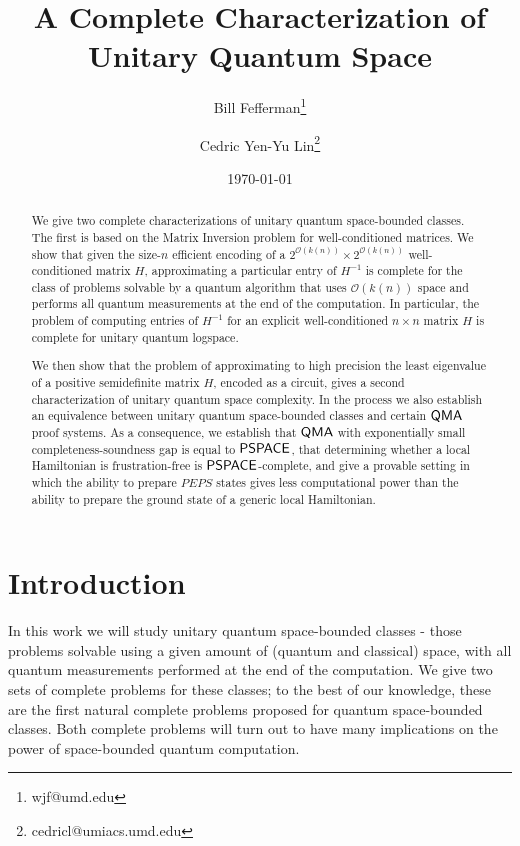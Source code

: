 \documentclass[11pt]{article}
\theoremstyle{definition}
\theoremstyle{remark}
\newcommand\QMA{{\sf{QMA}}}
\newcommand\PSPACE{{\sf{PSPACE}}}
\begin{document}
\begin{titlepage}
\title{A Complete Characterization of Unitary Quantum Space}
\author[1]{Bill Fefferman\thanks{wjf@umd.edu}}
\author[1]{Cedric Yen-Yu Lin\thanks{cedricl@umiacs.umd.edu}}
\date{\today}
\maketitle
\begin{abstract}
We give two complete characterizations of unitary quantum space-bounded classes.  The first is based on the Matrix Inversion problem for well-conditioned matrices.  We show that given the size-$n$ efficient encoding of a $2^{\mathcal{O}(k(n))} \times 2^{\mathcal{O}(k(n))}$ well-conditioned matrix $H$, approximating a particular entry of $H^{-1}$ is complete for the class of problems solvable by a quantum algorithm that uses $\mathcal{O}(k(n))$ space and performs all quantum measurements at the end of the computation. In particular, the problem of computing entries of $H^{-1}$ for an explicit well-conditioned $n \times n$ matrix $H$ is complete for unitary quantum logspace.

We then show that the problem of approximating to high precision the least eigenvalue of a positive semidefinite matrix $H$, encoded as a circuit, gives a second characterization of unitary quantum space complexity. In the process we also establish an equivalence between unitary quantum space-bounded classes and certain $\QMA$ proof systems. As a consequence, we establish that $\QMA$ with exponentially small completeness-soundness gap is equal to $\PSPACE$, that determining whether a local Hamiltonian is frustration-free is $\PSPACE$-complete, and give a provable setting in which the ability to prepare $PEPS$ states gives less computational power than the ability to prepare the ground state of a generic local Hamiltonian.
\end{abstract}
\thispagestyle{empty}
\end{titlepage}
\clearpage
\setcounter{page}{1}
\section{Introduction}
In this work we will study unitary quantum space-bounded classes - those problems solvable using a given amount of (quantum and classical) space, with all quantum measurements performed at the end of the computation. We give two sets of complete problems for these classes; to the best of our knowledge, these are the first natural complete problems proposed for quantum space-bounded classes. Both complete problems will turn out to have many implications on the power of space-bounded quantum computation.
\end{document}
